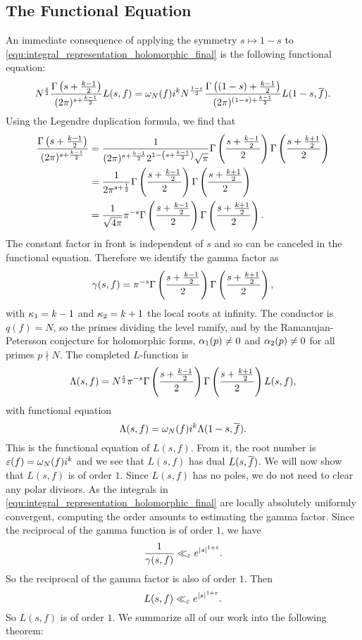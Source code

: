     \subsection*{The Functional Equation}
      An immediate consequence of applying the symmetry $s \mapsto 1-s$ to \cref{equ:integral_representation_holomorphic_final} is the following functional equation:
      \[
        N^{\frac{s}{2}}\frac{\Gamma\left(s+\frac{k-1}{2}\right)}{(2\pi)^{s+\frac{k-1}{2}}}L(s,f) = \omega_{N}(f)i^{k}N^{\frac{1-s}{2}}\frac{\Gamma\left((1-s)+\frac{k-1}{2}\right)}{(2\pi)^{(1-s)+\frac{k-1}{2}}}L(1-s,\overline{f}).
      \]
      Using the Legendre duplication formula, we find that
      \begin{align*}
        \frac{\Gamma\left(s+\frac{k-1}{2}\right)}{(2\pi)^{s+\frac{k-1}{2}}} &= \frac{1}{(2\pi)^{s+\frac{k-1}{2}}2^{1-\left(s+\frac{k-1}{2}\right)}\sqrt{\pi}}\Gamma\left(\frac{s+\frac{k-1}{2}}{2}\right)\Gamma\left(\frac{s+\frac{k+1}{2}}{2}\right) \\
        &= \frac{1}{2\pi^{s+\frac{1}{2}}}\Gamma\left(\frac{s+\frac{k-1}{2}}{2}\right)\Gamma\left(\frac{s+\frac{k+1}{2}}{2}\right) \\ 
        &= \frac{1}{\sqrt{4\pi}}\pi^{-s}\Gamma\left(\frac{s+\frac{k-1}{2}}{2}\right)\Gamma\left(\frac{s+\frac{k+1}{2}}{2}\right).
      \end{align*}
      The constant factor in front is independent of $s$ and so can be canceled in the functional equation. Therefore we identify the gamma factor as
      \[
        \gamma(s,f) = \pi^{-s}\Gamma\left(\frac{s+\frac{k-1}{2}}{2}\right)\Gamma\left(\frac{s+\frac{k+1}{2}}{2}\right),
      \]
      with $\kappa_{1} = k-1$ and $\kappa_{2} = k+1$ the local roots at infinity. The conductor is $q(f) = N$, so the primes dividing the level ramify, and by the Ramanujan-Petersson conjecture for holomorphic forms, $\alpha_{1}(p) \neq 0$ and $\alpha_{2}(p) \neq 0$ for all primes $p \nmid N$. The completed $L$-function is
      \[
        \Lambda(s,f) = N^{\frac{s}{2}}\pi^{-s}\Gamma\left(\frac{s+\frac{k-1}{2}}{2}\right)\Gamma\left(\frac{s+\frac{k+1}{2}}{2}\right)L(s,f),
      \]
      with functional equation
      \[
        \Lambda(s,f) = \omega_{N}(f)i^{k}\Lambda(1-s,\overline{f}).
      \]
      This is the functional equation of $L(s,f)$. From it, the root number is $\varepsilon(f) = \omega_{N}(f)i^{k}$ and we see that $L(s,f)$ has dual $L(s,\overline{f})$. We will now show that $L(s,f)$ is of order $1$. Since $L(s,f)$ has no poles, we do not need to clear any polar divisors. As the integrals in \cref{equ:integral_representation_holomorphic_final} are locally absolutely uniformly convergent, computing the order amounts to estimating the gamma factor. Since the reciprocal of the gamma function is of order $1$, we have
      \[
        \frac{1}{\gamma(s,f)} \ll_{\varepsilon} e^{|s|^{1+\varepsilon}}.
      \]
      So the reciprocal of the gamma factor is also of order $1$. Then
      \[
        L(s,f) \ll_{\varepsilon} e^{|s|^{1+\varepsilon}}.
      \]
      So $L(s,f)$ is of order $1$. We summarize all of our work into the following theorem:

